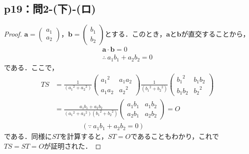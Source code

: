 \documentclass[a4paper,10pt,fleqn]{ltjsarticle}
\begin{document}
\subsection*{p19：問2-(下)-(ロ)}
\begin{tleftbar}
    \begin{proof}
        $\bm{a}=
            \begin{pmatrix}
                a_1 \\
                a_2
            \end{pmatrix}
        $，$\bm{b}=
            \begin{pmatrix}
                b_1 \\
                b_2
            \end{pmatrix}
        $とする．このとき，$\bm{a}$と$\bm{b}$が直交することから，
        \begin{gather*}
            \bm{a} \cdot \bm{b}=0 \\
            \therefore ~a_1 b_1 + a_2 b_2 =0
        \end{gather*}
        である．ここで，
        \begin{align*}
            TS & = \frac{1}{({a_1}^2 +{a_2}^2)}
            \begin{pmatrix}
                {a_1}^2 & a_1 a_2 \\
                a_1 a_2 & {a_2}^2
            \end{pmatrix}
            \frac{1}{({b_1}^2 +{b_2}^2)}
            \begin{pmatrix}
                {b_1}^2 & b_1 b_2 \\
                b_1 b_2 & {b_2}^2
            \end{pmatrix}
            \\
               & =\frac{a_1 b_1 + a_2 b_2}{({a_1}^2 +{a_2}^2)({b_1}^2 +{b_2}^2)}
            \begin{pmatrix}
                a_1 b_1 & a_1 b_2 \\
                a_2 b_1 & a_2 b_2
            \end{pmatrix}
            =O                                                                   \\
               & \qquad \qquad  (\because ~ a_1 b_1 + a_2 b_2 =0)
        \end{align*}
        である．同様に$ST$を計算すると，$ST=O$であることもわかり，これで$TS=ST=O$が証明された．
    \end{proof}
\end{tleftbar}
\end{document}
